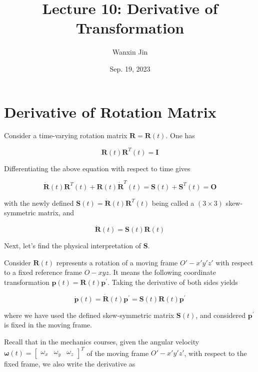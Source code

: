 \documentclass[10pt]{article}
\begin{document}
\title{Lecture 10: Derivative of Transformation}
\date{Sep. 19, 2023}
\author{Wanxin Jin}
\maketitle




\section{Derivative of Rotation Matrix}

\noindent
Consider a time-varying rotation matrix $\boldsymbol{R}=\boldsymbol{R}(t)$. One has

$$
\boldsymbol{R}(t) \boldsymbol{R}^{T}(t)=\boldsymbol{I}
$$

Differentiating the above equation with respect to time gives

$$
\dot{\boldsymbol{R}}(t) \boldsymbol{R}^{T}(t)+\boldsymbol{R}(t) \dot{\boldsymbol{R}}^{T}(t)=\boldsymbol{S}(t)+\boldsymbol{S}^{T}(t)=\boldsymbol{O}
$$

with the newly defined $\boldsymbol{S}(t)=\dot{\boldsymbol{R}}(t) \boldsymbol{R}^{T}(t)$ being called a $(3 \times 3)$ skew-symmetric matrix, and 

$$
\dot{\boldsymbol{R}}(t)=\boldsymbol{S}(t) \boldsymbol{R}(t)
$$


Next, let's find the physical interpretation of $\boldsymbol{S}$.




Consider ${\boldsymbol{R}}(t)$ represents a rotation of a moving frame $O'-x'y'z'$ with respect to a fixed reference frame $O-xyz$. It means the following coordinate transformation
 $\boldsymbol{p}(t)=\boldsymbol{R}(t) \boldsymbol{p}^{\prime}$. Taking the derivative of both sides yields


$$
\dot{\boldsymbol{p}}(t)=\dot{\boldsymbol{R}}(t) \boldsymbol{p}^{\prime}=\boldsymbol{S}(t) \boldsymbol{R}(t) \boldsymbol{p}^{\prime}
$$

where we have used the defined skew-symmetric matrix $ \boldsymbol{S}(t)$, and  considered $\boldsymbol{p}^\prime$ is fixed in the moving  frame.

Recall that in the mechanics courses, given the angular velocity $\boldsymbol{\omega}(t)=\left[\begin{array}{lll}\omega_{x} & \omega_{y} & \omega_{z}\end{array}\right]^{T}$ of the moving frame  $O'-x'y'z'$, with respect to the fixed frame, we also write the derivative 
as
\end{document}
